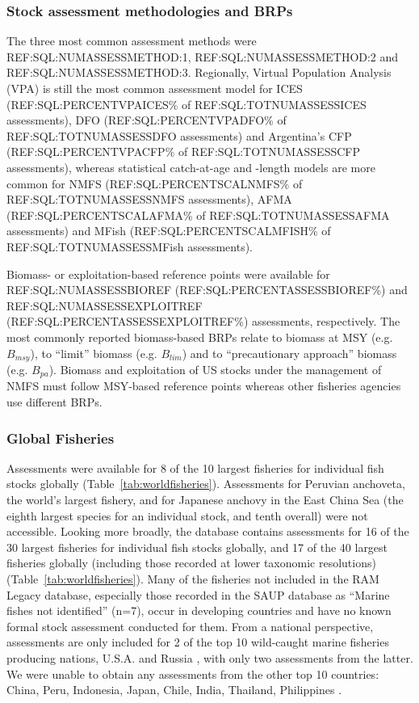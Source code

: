 \subsubsection*{Stock assessment methodologies and BRPs}

The three most common assessment methods were
REF:SQL:NUMASSESSMETHOD:1, REF:SQL:NUMASSESSMETHOD:2 and
REF:SQL:NUMASSESSMETHOD:3. Regionally, Virtual Population Analysis
(VPA) is still the most common assessment model for ICES
(REF:SQL:PERCENTVPAICES\% of REF:SQL:TOTNUMASSESSICES assessments), DFO
(REF:SQL:PERCENTVPADFO\% of REF:SQL:TOTNUMASSESSDFO assessments) and Argentina's CFP
(REF:SQL:PERCENTVPACFP\% of REF:SQL:TOTNUMASSESSCFP assessments), whereas statistical
catch-at-age and -length models are more common for NMFS
(REF:SQL:PERCENTSCALNMFS\% of REF:SQL:TOTNUMASSESSNMFS assessments), AFMA
(REF:SQL:PERCENTSCALAFMA\% of REF:SQL:TOTNUMASSESSAFMA assessments) and MFish
(REF:SQL:PERCENTSCALMFISH\% of REF:SQL:TOTNUMASSESSMFish assessments).

Biomass- or exploitation-based reference points were available for
REF:SQL:NUMASSESSBIOREF (REF:SQL:PERCENTASSESSBIOREF\%) and
REF:SQL:NUMASSESSEXPLOITREF (REF:SQL:PERCENTASSESSEXPLOITREF\%)
assessments, respectively. The most commonly reported biomass-based
BRPs relate to biomass at MSY (e.g. $B_{msy}$), to ``limit'' biomass
(e.g. $B_{lim}$) and to ``precautionary approach'' biomass (e.g.
$B_{pa}$). Biomass and exploitation of US stocks under the management
of NMFS must follow MSY-based reference points whereas other fisheries
agencies use different BRPs.

\subsubsection*{Global Fisheries}
Assessments were available for 8 of the 10 largest fisheries for
individual fish stocks globally (Table~\ref{tab:worldfisheries}). Assessments for Peruvian
anchoveta, the world's largest fishery, and for Japanese anchovy in
the East China Sea (the eighth largest species for an individual
stock, and tenth overall) were not accessible. Looking more broadly,
the database contains assessments for 16 of the 30 largest fisheries
for individual fish stocks globally, and 17 of the 40 largest
fisheries globally (including those recorded at lower taxonomic
resolutions) (Table~\ref{tab:worldfisheries}). Many of the fisheries not included in the RAM
Legacy database, especially those recorded in the SAUP database as
``Marine fishes not identified'' (n=7), occur in developing countries
and have no known formal stock assessment conducted for them.  From a
national perspective, assessments are only included for 2 of the top
10 wild-caught marine fisheries producing nations, U.S.A. and Russia
\citep{FAO:sofia}, with only two assessments from the latter. We were unable
to obtain any assessments from the other top 10 countries: China,
Peru, Indonesia, Japan, Chile, India, Thailand, Philippines \citep{FAO:sofia}.



